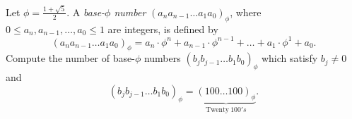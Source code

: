 Let $\phi = \frac{1+\sqrt{5}}{2}$. A \emph{base-$\phi$ number} $(a_n a_{n-1} \ldots a_1 {a_0})_{\phi}$, where $0 \le a_n, a_{n-1}, \ldots, a_0 \le 1$ are integers, is defined by \[ (a_n a_{n-1} \ldots a_1 {a_0})_{\phi} = a_n \cdot \phi^n + a_{n-1} \cdot \phi^{n-1} + \ldots + a_1 \cdot \phi^1 + a_0. \]
Compute the number of base-$\phi$ numbers $(b_jb_{j-1}\ldots b_1{b_0})_\phi$ which satisfy $b_j \ne 0$ and
\[ (b_jb_{j-1}\ldots b_1{b_0})_\phi = \underbrace{(100 \ldots 100)_\phi}_{\text{Twenty}\ 100's}. \]
